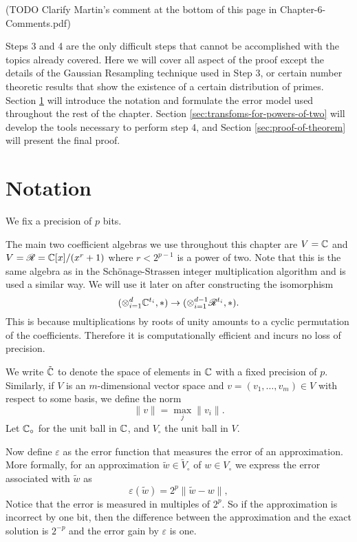 (TODO Clarify Martin's comment at the bottom of this page in Chapter-6-Comments.pdf)

\medskip

Steps 3 and 4 are the only difficult steps that cannot be accomplished with the topics already covered. Here we will cover all aspect of the proof except the details of the Gaussian Resampling technique used in Step 3, or certain number theoretic results that show the existence of a certain distribution of primes. Section \ref{sec:notation} will introduce the notation and formulate the error model used throughout the rest of the chapter. Section \ref{sec:transfoms-for-powers-of-two} will develop the tools necessary to perform step 4, and Section \ref{sec:proof-of-theorem} will present the final proof.

\section{Notation}%
\label{sec:notation}

We fix a precision of $p$ bits.

The main two coefficient algebras we use throughout this chapter are $V = {\mathbb C}$ and $V = \mathscr{R} = {\mathbb C}[x]/(x^r + 1)$ where $r < 2^{p-1}$ is a power of two. Note that this is the same algebra as in the Sch\"{o}nage-Strassen integer multiplication algorithm and is used a similar way. We will use it later on after constructing the isomorphism
\[
    (\otimes^d_{i=1}{\mathbb C}^{t_i}, \ast) \to (\otimes_{i=1}^{d-1} \mathscr{R}^{t_i}, \ast).
\]
This is because multiplications by roots of unity amounts to a cyclic permutation of the coefficients. Therefore it is computationally efficient and incurs no loss of precision.

We write $\tilde{{\mathbb C}}$ to denote the space of elements in ${\mathbb C}$ with a fixed precision of $p$. Similarly, if $V$ is an $m$-dimensional vector space and $v = (v_1, \ldots, v_m) \in V$ with respect to some basis, we define the norm
\[
    \|v\| = \max_j \|v_i\|.
\]
Let ${\mathbb C}_\circ$ for the unit ball in ${\mathbb C}$, and $V_\circ$ the unit ball in $V$.

Now define $\varepsilon$ as the error function that measures the error of an approximation. More formally, for an approximation $\tilde{w} \in \tilde{V}_\circ$ of $w \in V_\circ$ we express the error associated with $\tilde{w}$ as
\[
    \varepsilon(\tilde{w}) = 2^p \|\tilde{w} - w\|,
\]
Notice that the error is measured in multiples of $2^p$. So if the approximation is incorrect by one bit, then the difference between the approximation and the exact solution is $2^{-p}$ and the error gain by $\varepsilon$ is one.

